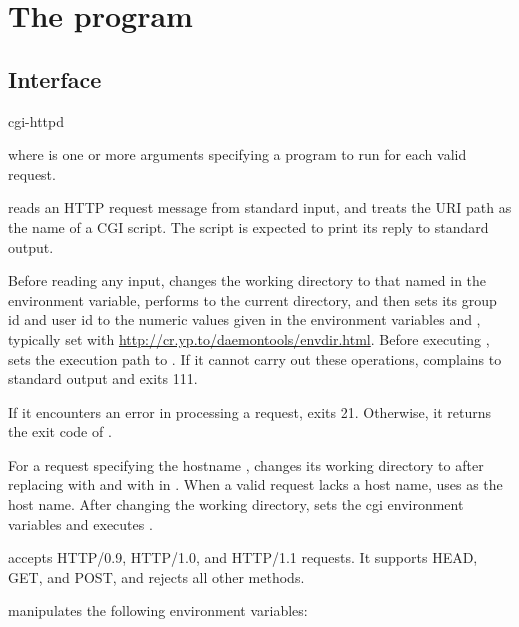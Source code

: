 
\chapter{The  program}

\section{Interface}
\begin{code}
  cgi-httpd 
\end{code}
where  is one or more arguments specifying a program to run
for each valid request.

 reads an HTTP request message from standard input,
and treats the URI path as the name of a CGI script.  The script is
expected to print its reply to standard output.

Before reading any input,  changes the working directory to that
named in the  environment variable, performs  to the
current directory, and then sets its group id and user id to the numeric values
given in the environment variables  and , typically set
with \href{\cmd{envdir}}{http://cr.yp.to/daemontools/envdir.html}.  Before
executing ,  sets the execution path to .
If it cannot carry out these operations,  complains to standard
output and exits 111.

If it encounters an error in processing a request, 
exits 21.  Otherwise, it returns the exit code of .

For a request specifying the hostname , 
changes its working directory to  after replacing
  with \cmd{/:} and \cmd{//} with \cmd{/} in
.  When a valid request lacks a host name,
 uses  as the host name.  After changing the
working directory,  sets the cgi environment variables
and executes .

 accepts HTTP/0.9, HTTP/1.0, and HTTP/1.1 requests.  It
supports HEAD, GET, and POST, and rejects all other methods.

 manipulates the following environment variables:

